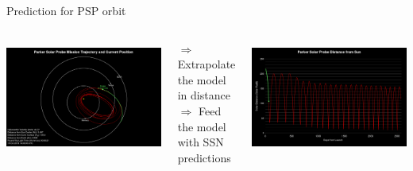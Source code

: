 \begin{frame}[plain,c]{Prediction for PSP orbit}{}
	\begin{columns}[t]	%
	
		\hspace*{-22pt}
		\includegraphics[height=0.9\textwidth]{../talk_figures/psp201810_0400_top.png}
		
		$\Rightarrow$ Extrapolate the model in distance\\
		$\Rightarrow$ Feed the model with SSN predictions

	
		\hspace*{-10pt}
		\includegraphics[height=0.9\textwidth]{../talk_figures/psp201810_0400_bottom.png}
		

\end{columns}
\end{frame}
